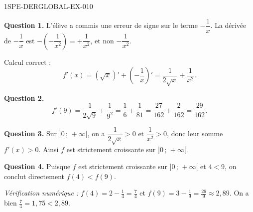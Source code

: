 \begin{corrige}{1SPE-DERGLOBAL-EX-010}

\textbf{Question 1.} L'élève a commis une erreur de signe sur le terme $-\dfrac{1}{x}$. La dérivée de $-\dfrac{1}{x}$ est $-\left(-\dfrac{1}{x^2}\right) = +\dfrac{1}{x^2}$, et non $-\dfrac{1}{x^2}$.

Calcul correct :
\[
f'(x) = (\sqrt{x})' + \left(-\frac{1}{x}\right)' = \frac{1}{2\sqrt{x}} + \frac{1}{x^2}.
\]

\textbf{Question 2.}
\[
f'(9) = \frac{1}{2\sqrt{9}} + \frac{1}{9^2} = \frac{1}{6} + \frac{1}{81} = \frac{27}{162} + \frac{2}{162} = \boxed{\frac{29}{162}}.
\]

\textbf{Question 3.} Sur $]0\,;\,+\infty[$, on a $\dfrac{1}{2\sqrt{x}} > 0$ et $\dfrac{1}{x^2} > 0$, donc leur somme $f'(x) > 0$. Ainsi $f$ est strictement croissante sur $]0\,;\,+\infty[$.

\textbf{Question 4.} Puisque $f$ est strictement croissante sur $]0\,;\,+\infty[$ et $4 < 9$, on conclut directement $f(4) < f(9)$.

\textit{Vérification numérique :} $f(4) = 2 - \tfrac{1}{4} = \tfrac{7}{4}$ et $f(9) = 3 - \tfrac{1}{9} = \tfrac{26}{9} \approx 2{,}89$. On a bien $\tfrac{7}{4} = 1{,}75 < 2{,}89$. \checkmark
\end{corrige}
